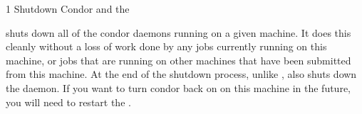 \begin{ManPage}{\label{man-condor-master-off}}{1}
{Shutdown Condor and the }
\Synopsis {}

\Description 

 shuts down all of the condor daemons running on a given
machine.  It does this cleanly without a loss of work done by any jobs
currently running on this machine, or jobs that are running on other machines
that have been submitted from this machine.  At the end of the shutdown
process, unlike ,  also shuts down the
 daemon.  If you want to turn condor back on on this machine in
the future, you will need to restart the .

\begin{Options}
\end{Options}

\end{ManPage}
